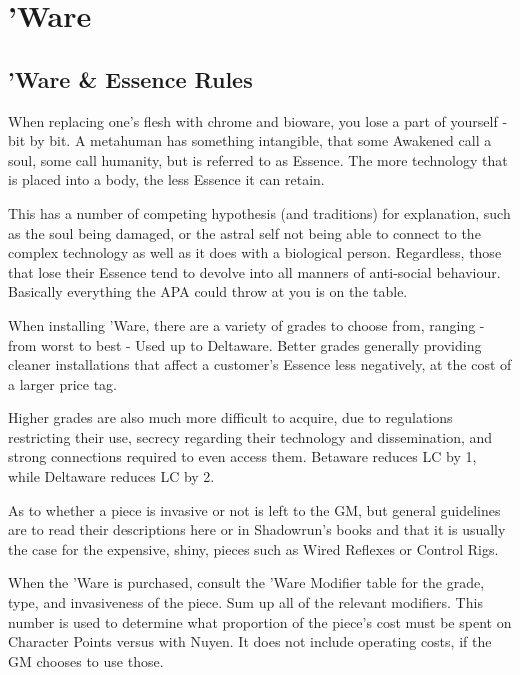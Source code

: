 \section{'Ware}\label{ware}

\begin{multicols*}{3}
	
	\subsection{'Ware \& Essence Rules}
	
	When replacing one's flesh with chrome and bioware, you lose a part of yourself - bit by bit. A metahuman has something intangible, that some Awakened call a soul, some call humanity, but is referred to as Essence. The more technology that is placed into a body, the less Essence it can retain. 
	
	This has a number of competing hypothesis (and traditions) for explanation, such as the soul being damaged, or the astral self not being able to connect to the complex technology as well as it does with a biological person. Regardless, those that lose their Essence tend to devolve into all manners of anti-social behaviour. Basically everything the APA could throw at you is on the table.
	
	When installing 'Ware, there are a variety of grades to choose from, ranging - from worst to best - Used up to Deltaware. Better grades generally providing cleaner installations that affect a customer's Essence less negatively, at the cost of a larger price tag. 
	
	Higher grades are also much more difficult to acquire, due to regulations restricting their use, secrecy regarding their technology and dissemination, and strong connections required to even access them. Betaware reduces LC by 1, while Deltaware reduces LC by 2.
	
	As to whether a piece is invasive or not is left to the GM, but general guidelines are to read their descriptions here or in Shadowrun's books and that it is usually the case for the expensive, shiny, pieces such as Wired Reflexes or Control Rigs.
	
	When the 'Ware is purchased, consult the 'Ware Modifier table for the grade, type, and invasiveness of the piece. Sum up all of the relevant modifiers. This number is used to determine what proportion of the piece's cost must be spent on Character Points versus with Nuyen. It does not include operating costs, if the GM chooses to use those.
	

\end{multicols*}
